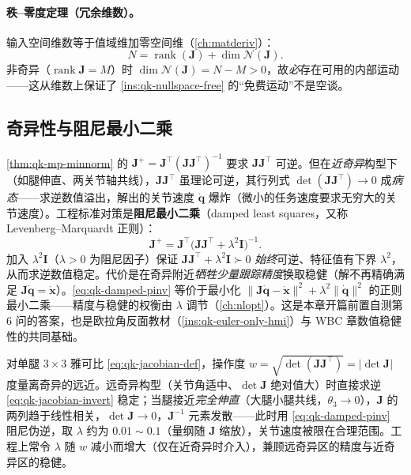\paragraph{秩--零度定理（冗余维数）。}
输入空间维数等于值域维加零空间维（\cref{ch:matderiv}）\cite{yu2021quadruped}：
\begin{equation}
  N=\operatorname{rank}(\mathbf{J})+\dim\mathcal{N}(\mathbf{J}).
  \label{eq:qk-rank-nullity}
\end{equation}
非奇异（$\operatorname{rank}\mathbf{J}=M$）时 $\dim\mathcal{N}(\mathbf{J})=N-M>0$，故\emph{必}存在可用的内部运动——这从维数上保证了 \cref{ins:qk-nullspace-free} 的“免费运动”不是空谈。

\subsection{奇异性与阻尼最小二乘}
\label{subsec:qk-singularity}

\begin{insight}\label{ins:qk-damped}
\cref{thm:qk-mp-minnorm} 的 $\mathbf{J}^{+}=\mathbf{J}^\top(\mathbf{J}\mathbf{J}^\top)^{-1}$ 要求 $\mathbf{J}\mathbf{J}^\top$ 可逆。但在\emph{近奇异}构型下（如腿伸直、两关节轴共线），$\mathbf{J}\mathbf{J}^\top$ 虽理论可逆，其行列式 $\det(\mathbf{J}\mathbf{J}^\top)\to0$ 成\emph{病态}——求逆数值溢出，解出的关节速度 $\dot{\boldsymbol{q}}$ 爆炸（微小的任务速度要求无穷大的关节速度）。工程标准对策是\textbf{阻尼最小二乘}（damped least squares，又称 Levenberg--Marquardt 正则）\cite{yu2021quadruped}：
\begin{equation}
  \mathbf{J}^{+}=\mathbf{J}^\top\big(\mathbf{J}\mathbf{J}^\top+\lambda^2\mathbf{I}\big)^{-1}.
  \label{eq:qk-damped-pinv}
\end{equation}
加入 $\lambda^2\mathbf{I}$（$\lambda>0$ 为阻尼因子）保证 $\mathbf{J}\mathbf{J}^\top+\lambda^2\mathbf{I}\succ0$ \emph{始终}可逆、特征值有下界 $\lambda^2$，从而求逆数值稳定。代价是在奇异附近\emph{牺牲少量跟踪精度}换取稳健（解不再精确满足 $\mathbf{J}\dot{\boldsymbol{q}}=\dot{\boldsymbol{x}}$）。\cref{eq:qk-damped-pinv} 等价于最小化 $\|\mathbf{J}\dot{\boldsymbol{q}}-\dot{\boldsymbol{x}}\|^2+\lambda^2\|\dot{\boldsymbol{q}}\|^2$ 的正则最小二乘——精度与稳健的权衡由 $\lambda$ 调节（\cref{ch:nlopt}）。这是本章开篇前置自测第 6 问的答案，也是欧拉角反面教材（\cref{ins:qk-euler-only-hmi}）与 WBC 章数值稳健性的共同基础。
\end{insight}

\begin{example}[雅可比奇异性的数值演示]\label{exam:qk-singular}
对单腿 $3\times3$ 雅可比 \cref{eq:qk-jacobian-def}，操作度 $w=\sqrt{\det(\mathbf{J}\mathbf{J}^\top)}=|\det\mathbf{J}|$ 度量离奇异的远近。远奇异构型（关节角适中、$\det\mathbf{J}$ 绝对值大）时直接求逆 \cref{eq:qk-jacobian-invert} 稳定；当腿接近\emph{完全伸直}（大腿小腿共线，$\theta_3\to0$），$\mathbf{J}$ 的两列趋于线性相关，$\det\mathbf{J}\to0$，$\mathbf{J}^{-1}$ 元素发散——此时用 \cref{eq:qk-damped-pinv} 阻尼伪逆，取 $\lambda$ 约为 $0.01\sim0.1$（量纲随 $\mathbf{J}$ 缩放），关节速度被限在合理范围。工程上常令 $\lambda$ 随 $w$ 减小而增大（仅在近奇异时介入），兼顾远奇异区的精度与近奇异区的稳健。
\end{example}

